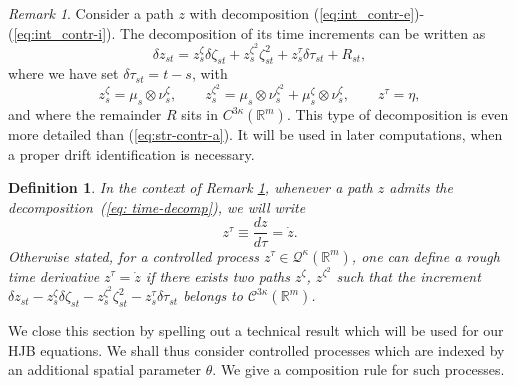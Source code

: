 \documentclass[12pt,reqno]{amsart}
\numberwithin{equation}{section}  %
\newcommand{\1}{{\bf 1}}
\newcommand{\2}{{\bf 2}}
\newcommand{\R}{\mathbb R}
\newcommand{\ka}{\kappa}
\newtheorem{definition}[theorem]{Definition}
\theoremstyle{remark}
\newtheorem{remark}[theorem]{Remark}
\theoremstyle{remark}
\begin{document}
\begin{remark} \label{rmk: time-decomp}
    Consider a path $z$ with decomposition (\ref{eq:int_contr-e})-(\ref{eq:int_contr-i}). The decomposition of its time increments can be written as
    \begin{equation} \label{eq: time-decomp}
        \delta z_{st}=z_{s}^{\zeta}\delta \zeta_{st}+z_{s}^{\zeta^{2}}\zeta^{2}_{st}+z_{s}^{\tau}\delta \tau _{st}+R_{st},
    \end{equation}
    where we have set $\delta \tau _{st}=t-s$, with
    \[z_{s}^{\zeta}=\mu_{s}\otimes \nu_{s}^{\zeta}, 
    \qquad z_{s}^{\zeta^{2}}=\mu_{s}\otimes\nu_{s}^{\zeta^{2}}+\mu_{s}^{\zeta}\otimes \nu_{s}^{\zeta},
    \qquad z^{\tau}=\eta,\]
    and where the remainder $R$ sits in $C^{3\kappa}(\R^{m})$. This type of decomposition is even more detailed than (\ref{eq:str-contr-a}). It will be used in later computations, when a proper drift identification is necessary.
\end{remark}
\begin{definition}\label{def:time_deriv}
    In the context of Remark \ref{rmk: time-decomp}, whenever a path $z$ admits the decomposition~(\ref{eq: time-decomp}), we will write
    \begin{equation}
      \label{eq:time-not}  z^{\tau}\equiv \frac{dz}{d\tau}=\dot z.
    \end{equation}
    Otherwise stated, for a controlled process $z^{\tau}\in \mathcal{Q}^{\ka}(\R^{m})$, one can define a rough time derivative $z^{\tau}=\dot{z}$ if there exists two paths $z^{\zeta}$, $z^{\zeta^{2}}$ such that the increment $\delta z_{st}-z_{s}^{\zeta}\delta \zeta_{st}-z_{s}^{\zeta^{2}}\zeta^{2}_{st}-z_{s}^{\tau} \delta \tau_{st}$ belongs to $\mathcal{C}^{3\kappa}(\R^{m})$.
\end{definition}
We close this section by spelling out a technical result which will be used for our HJB equations. We shall thus consider controlled processes which are indexed by an additional spatial parameter $\theta$. We give a composition rule for such processes. 
\end{document}
